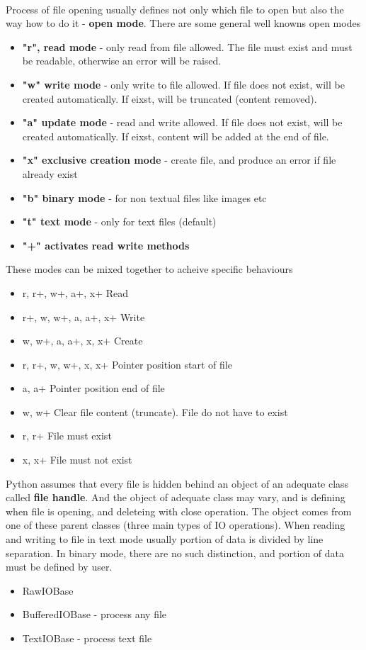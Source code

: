 \documentclass{article}
\begin{document}
\paragraph{}
Process of file opening usually defines not only which file to open but also the way how to do it - \textbf{open mode}. There are some general well knowns open modes
\begin{itemize}
\item \textbf{"r", read mode} - only read from file allowed. The file must exist and must be readable, otherwise an error will be raised.
\item \textbf{"w" write mode} - only write to file allowed. If file does not exist, will be created automatically. If eixst, will be truncated (content removed).
\item \textbf{"a" update mode} - read and write allowed. If file does not exist, will be created automatically. If eixst, content will be added at the end of file.
\item \textbf{"x" exclusive creation mode} - create file, and produce an error if file already exist
\item \textbf{"b" binary mode} - for non textual files like images etc
\item \textbf{"t" text mode} - only for text files (default)
\item \textbf{"+" activates read write methods}
\end{itemize}
These modes can be mixed together to acheive specific behaviours
\begin{itemize}
\item r, r+, w+, a+, x+ Read
\item r+, w, w+, a, a+, x+	Write
\item w, w+, a, a+, x, x+ Create
\item r, r+, w, w+, x, x+ Pointer position start of file
\item a, a+	Pointer position end of file
\item w, w+ Clear file content (truncate). File do not have to exist
\item r, r+ File must exist
\item x, x+ File must not exist
\end{itemize}
Python assumes that every file is hidden behind an object of an adequate class called \textbf{file handle}. And the object of adequate class may vary, and is defining when file is opening, and deleteing with close operation. The object comes from one of these parent classes (three main types of IO operations). When reading and writing to file in text mode usually portion of data is divided by line separation. In binary mode, there are no such distinction, and portion of data must be defined by user.
\begin{itemize}
\item RawIOBase
\item BufferedIOBase - process any file
\item TextIOBase - process text file
\end{itemize}
\end{document}
